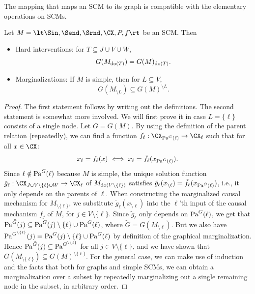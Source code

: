 The mapping that maps an SCM to its graph is compatible with the elementary operations on SCMs.
\begin{Prp}\label{prp:compatibility_graph}
  Let $M = \lt \Sin, \Send, \Srnd, \CX, P, f \rt$ be an SCM. Then
  \begin{itemize}
    \item Hard interventions: for $T \subseteq J \cup V \cup W$, 
      $$G(M_{\operatorname{do}(T)}) = G(M)_{\operatorname{do}(T)}.$$
    \item Marginalizations: If $M$ is simple, then for $L \subseteq V$, 
      $$G(M_{\setminus L}) \subseteq G(M)^{\setminus L}.$$
  \end{itemize}
\end{Prp}
\begin{proof}
  The first statement follows by writing out the definitions. The second statement is somewhat more involved. We will
  first prove it in case $L = \{\ell\}$ consists of a single node. 
  Let $G = G(M)$.
  By using the definition of the parent relation (repeatedly), we can find a function $\tilde{f}_\ell : \CX_{\Pa^G(\ell)} \to \CX_\ell$ such that
  for all $x \in \CX$:
  $$x_\ell = f_\ell(x) \iff x_\ell = \tilde{f}_\ell(x_{\mathrm{Pa}^G(\ell)}).$$
  Since $\ell \notin \mathrm{Pa}^G(\ell)$ because $M$ is simple, %
  the unique solution function
  $\tilde{g}_\ell : \CX_{J \cup V \setminus \{\ell\} \cup W} \to \CX_\ell$ of $M_{\operatorname{do}(V\setminus \{\ell\})}$
  satisfies $\tilde{g}_\ell(x_{\setminus \ell}) = \tilde{f}_\ell(x_{\mathrm{Pa}^G(\ell)})$, i.e., it only depends on the parents of $\ell$.
  When constructing the marginalized causal mechanism for $M_{\setminus \{\ell\}}$, we substitute 
  $\tilde{g}_\ell(x_{\setminus \ell})$ into the $\ell$'th input of the causal mechanism $f_j$ of $M$, for $j \in V\setminus \{\ell\}$.
  Since $\tilde{g}_\ell$ only depends on $\mathrm{Pa}^G(\ell)$,
  we get that $\mathrm{Pa}^{\tilde G}(j) \subseteq \mathrm{Pa}^G(j) \setminus \{\ell\} \cup \mathrm{Pa}^G(\ell)$, where $\tilde{G} = G(M_{\setminus \ell})$.
  But we also have $\mathrm{Pa}^{G^{\setminus \{\ell\}}}(j) = \mathrm{Pa}^G(j) \setminus \{\ell\} \cup \mathrm{Pa}^G(\ell)$ by definition of the graphical marginalization. 
  Hence $\mathrm{Pa}^{\tilde G}(j) \subseteq \mathrm{Pa}^{G^{\setminus \{\ell\}}}$ for all $j \in V\setminus \{\ell\}$, and we have shown that $G(M_{\setminus \{\ell\}}) \subseteq G(M)^{\setminus \{\ell\}}$.
  For the general case, we can make use of induction and the facts that both for
  graphs and simple SCMs, we can obtain a marginalization over a subset by repeatedly marginalizing out a single remaining node in the subset, in arbitrary order.
\end{proof}


